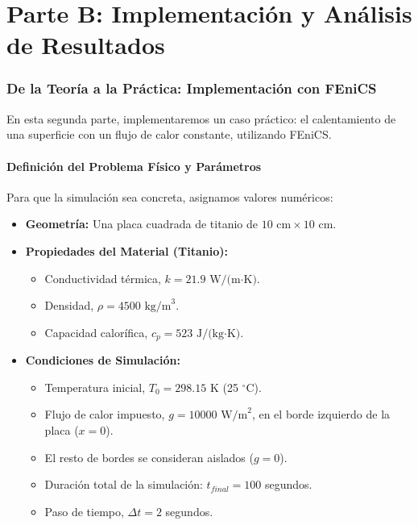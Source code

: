 \part*{Parte B: Implementación y Análisis de Resultados}

\section{De la Teoría a la Práctica: Implementación con FEniCS}
En esta segunda parte, implementaremos un caso práctico: el calentamiento de una superficie con un flujo de calor constante, utilizando FEniCS.

\subsection{Definición del Problema Físico y Parámetros}
Para que la simulación sea concreta, asignamos valores numéricos:
\begin{itemize}
    \item \textbf{Geometría:} Una placa cuadrada de titanio de $10 \text{ cm} \times 10 \text{ cm}$.
    \item \textbf{Propiedades del Material (Titanio):}
        \begin{itemize}
            \item Conductividad térmica, $k = 21.9 \text{ W/(m·K)}$.
            \item Densidad, $\rho = 4500 \text{ kg/m}^3$.
            \item Capacidad calorífica, $c_p = 523 \text{ J/(kg·K)}$.
        \end{itemize}
    \item \textbf{Condiciones de Simulación:}
        \begin{itemize}
            \item Temperatura inicial, $T_0 = 298.15 \text{ K}$ (25 $^{\circ}$C).
            \item Flujo de calor impuesto, $g = 10000 \text{ W/m}^2$, en el borde izquierdo de la placa ($x=0$).
            \item El resto de bordes se consideran aislados ($g=0$).
            \item Duración total de la simulación: $t_{final} = 100$ segundos.
            \item Paso de tiempo, $\Delta t = 2$ segundos.
        \end{itemize}
\end{itemize}

